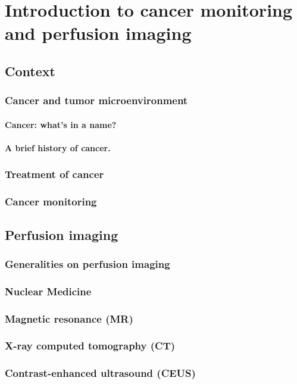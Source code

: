 \chapter{Introduction to cancer monitoring and perfusion imaging}\label{chapter:intro}



\section{Context}
\subsection{Cancer and tumor microenvironment}
\subsubsection{Cancer: what's in a name?}
\subsubsection{A brief history of cancer.}


\subsection{Treatment of cancer}
\subsection{Cancer monitoring}

\section{Perfusion imaging}
\label{sec:IntroPerfusionImaging}
\subsection{Generalities on perfusion imaging}
\subsection{Nuclear Medicine}
\label{sec:IntroNM}
\subsection{Magnetic resonance (MR)}
\label{sec:IntroMR}
\subsection{X-ray computed tomography (CT)}
\label{sec:IntroCT}
\subsection{Contrast-enhanced ultrasound (CEUS)}
\label{sec:IntroCEUS}


%